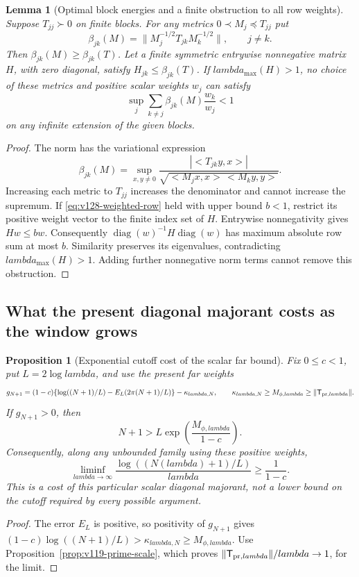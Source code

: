 \documentclass[11pt]{article}
\def\lambda{lambda}%
\def\ip#1#2{<#1,#2>}%
\newtheorem{lemma}[theorem]{Lemma}
\newtheorem{proposition}[theorem]{Proposition}
\theoremstyle{remark}
\newcommand{\ip}[2]{\left\langle #1,#2\right\rangle}
\begin{document}
\begin{lemma}[Optimal block energies and a finite obstruction to all row weights]
\label{lem:v128-comparison-obstruction}
Suppose $T_{jj}\succ0$ on finite blocks. For any metrics
$0\prec M_j\preceq T_{jj}$ put
\[
 \beta_{jk}(M)=\|M_j^{-1/2}T_{jk}M_k^{-1/2}\|,\qquad j\ne k.
\]
Then $\beta_{jk}(M)\ge\beta_{jk}(T)$. Let a finite symmetric
entrywise nonnegative matrix $H$, with zero diagonal, satisfy
$H_{jk}\le\beta_{jk}(T)$. If $\lambda_{\max}(H)>1$, no choice of
these metrics and positive scalar weights $w_j$ can satisfy
\begin{equation}\label{eq:v128-weighted-row}
 \sup_j\sum_{k\ne j}\beta_{jk}(M)\frac{w_k}{w_j}<1
\end{equation}
on any infinite extension of the given blocks.
\end{lemma}
\begin{proof}
The norm has the variational expression
\[
 \beta_{jk}(M)=\sup_{x,y\ne0}
 \frac{|\ip{T_{jk}y}{x}|}
 {\sqrt{\ip{M_jx}{x}\,\ip{M_ky}{y}}}.
\]
Increasing each metric to $T_{jj}$ increases the denominator and
cannot increase the supremum. If \eqref{eq:v128-weighted-row} held
with upper bound $b<1$, restrict its positive weight vector to the
finite index set of $H$. Entrywise nonnegativity gives $Hw\le bw$.
Consequently $\operatorname{diag}(w)^{-1}H\operatorname{diag}(w)$
has maximum absolute row sum at most $b$. Similarity preserves its
eigenvalues, contradicting $\lambda_{\max}(H)>1$. Adding further
nonnegative norm terms cannot remove this obstruction.
\end{proof}


\subsection{What the present diagonal majorant costs as the window grows}

\begin{proposition}[Exponential cutoff cost of the scalar far bound]
\label{prop:v125-cutoff-cost}
Fix $0\le c<1$, put $L=2\log\lambda$, and use the present far
weights
\[
 g_{N+1}=(1-c)\{\log((N+1)/L)-E_L(2\pi(N+1)/L)\}
               -\kappa_{\lambda,N},
 \qquad \kappa_{\lambda,N}\ge M_{\phi,\lambda}
                    \ge\|\mathsf T_{{\rm pr},\lambda}\|.
\]
If $g_{N+1}>0$, then
\begin{equation}\label{eq:v125-cutoff-cost}
 N+1>L\exp\!\left(\frac{M_{\phi,\lambda}}{1-c}\right).
\end{equation}
Consequently, along any unbounded family using these positive weights,
\[
 \liminf_{\lambda\to\infty}
 \frac{\log((N(\lambda)+1)/L)}{\lambda}\ge\frac1{1-c}.
\]
This is a cost of this particular scalar diagonal majorant, not a
lower bound on the cutoff required by every possible argument.
\end{proposition}
\begin{proof}
The error $E_L$ is positive, so positivity of $g_{N+1}$ gives
$(1-c)\log((N+1)/L)>\kappa_{\lambda,N}\ge M_{\phi,\lambda}$.
Use Proposition~\ref{prop:v119-prime-scale}, which proves
$\|\mathsf T_{{\rm pr},\lambda}\|/\lambda\to1$, for the limit.
\end{proof}
\end{document}
